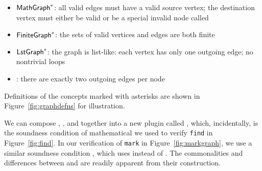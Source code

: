 \begin{itemize}
\vspace{-1ex}
\item $\mathsf{MathGraph}^{*}$: all valid edges must have a valid source vertex; the destination
vertex must either be valid or be a special invalid node called 
\item $\mathsf{FiniteGraph}^{*}$: the sets of valid vertices and edges are both finite
\item $\mathsf{LstGraph}^{*}$: the graph is list-like: each vertex has only one outgoing edge; no nontrivial loops
\item {}: there are exactly two outgoing edges per node
\end{itemize}
Definitions of the concepts marked with asterisks are
shown in {\color{red}Figure~\ref{fig:graphdefns}} for illustration.

We can compose
, , and 
together into a new plugin called , which, incidentally, is
the soundness condition of mathematical 
we used to verify \texttt{find} in
Figure~\ref{fig:find}.  In our verification of \texttt{mark} in
Figure~\ref{fig:markgraph}, we use a similar soundness condition
, which uses  instead of .
The commonalities and differences between 
and  are readily apparent from their construction.

\iffalse
\marginpar{\tiny \color{blue} Maybe move this somewhere.}
{\color{magenta}Coq also handles our notion of inherited
lemmas seamlessly: in our verfication of Find, we
work directly with a \p{LiMaFin} GeneralGraph, but, as
we saw, we still use properties such as reachability
and operations such as selective subtraction, which are defined on the
embedded PreGraph, not the GeneralGraph.
Coq handles the appropriate coercions with
remarkable elegance.}
\fi

